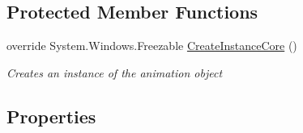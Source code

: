 \subsection*{Protected Member Functions}
\begin{DoxyCompactItemize}
\item 
override System.\+Windows.\+Freezable \mbox{\hyperlink{class_wpf_handler_1_1_u_i_1_1_animations_1_1_grid_length_animation_abf8dc83d562a5f43c9764c70d2d015f5}{Create\+Instance\+Core}} ()
\begin{DoxyCompactList}\small\item\em Creates an instance of the animation object \end{DoxyCompactList}\end{DoxyCompactItemize}
\subsection*{Properties}
